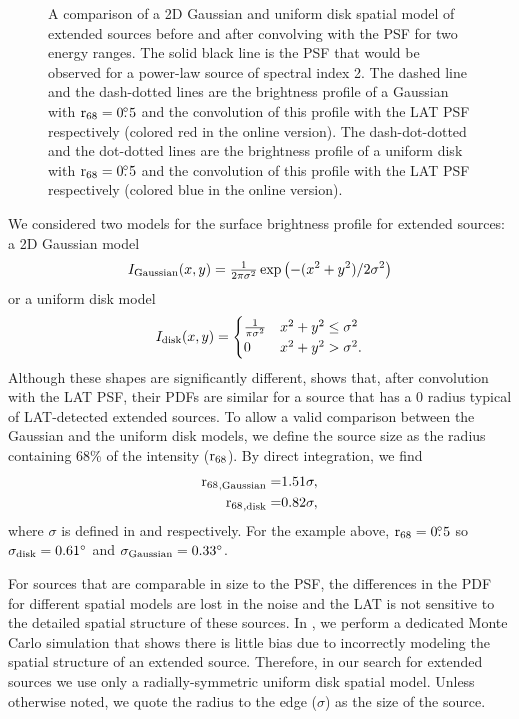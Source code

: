 \begin{figure}
    \caption{
    A comparison of a 2D Gaussian and uniform disk spatial model
    of extended sources before and after convolving with the PSF for two
    energy ranges.  The solid black line is the PSF that would be observed
    for a power-law source of spectral index 2. The dashed line
    and the dash-dotted lines are 
    the brightness profile of a Gaussian with ${\mathrm{r}_{68}}=0\mbox{$.\!\!^\circ$}5$
    and the convolution of this profile with the LAT PSF respectively
    (colored red in the online version).
    The dash-dot-dotted and the dot-dotted lines are the brightness profile
    of a uniform disk with ${\mathrm{r}_{68}}=0\mbox{$.\!\!^\circ$}5$ and the convolution
    of this profile with the LAT PSF respectively (colored blue in the online version).
    }
  \end{figure}


We considered two models for the
surface brightness profile for extended sources: a 2D Gaussian model
\begin{equation}\eqnlabel{gauss_pdf}
  I_\text{Gaussian}(x,y)=\tfrac{1}{2\pi\sigma^2}\exp\left(-(x^2+y^2)/2\sigma^2\right)
\end{equation}
or a uniform disk model
\begin{equation}\eqnlabel{disk_pdf}
  I_\text{disk}(x,y)=
  \begin{cases}
    \frac{1}{\pi\sigma^2} & x^2+y^2\le\sigma^2 \\
    0                      & x^2+y^2>\sigma^2.
  \end{cases}
\end{equation}
Although these shapes are significantly different,
 shows that, after convolution with the
LAT PSF, their PDFs are similar for a source that has a 0 radius
typical of LAT-detected extended sources.  To allow a valid comparison
between the Gaussian and the uniform disk models,
we define the source size as the radius containing 68\% of the
intensity (${\mathrm{r}_{68}}$). 
By direct integration, we find
\begin{align}
{\ensuremath{\mathrm{r}_{68}}}_\text{,Gaussian}=&1.51\sigma, \\
{\mathrm{r}_{68}}_\text{,disk}=&0.82\sigma, 
\end{align}
where $\sigma$ is defined
in  and  respectively.
For the example above, ${\mathrm{r}_{68}}=0\mbox{$.\!\!^\circ$}5$ so $\sigma_\text{disk}=0.61^\circ$
and $\sigma_\text{Gaussian}=0.33^\circ$.

For sources that are comparable in size to the PSF,
the differences in the PDF for
different spatial models are lost in the noise and the LAT is not sensitive
to the detailed spatial structure of these sources.  
In , we perform a dedicated Monte Carlo simulation
that shows there is little bias due to incorrectly modeling the spatial structure
of an extended source.
Therefore, in our search for extended sources we use only a radially-symmetric uniform
disk spatial model. Unless otherwise noted,
we quote the radius to the edge ($\sigma$) as the size of the source.

